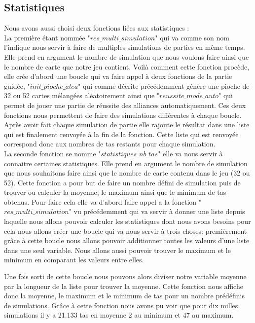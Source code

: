 \documentclass[10pt,a4paper,french,titlepage]{article}
\theoremstyle{definition}
\begin{document}
\subsection{Statistiques}
Nous avons aussi choisi deux fonctions liées aux statistiques : \\
La première étant nommée "$res\_multi\_simulation$" qui va comme son nom l'indique nous servir à faire de multiples simulations de parties en même temps. Elle prend en argument le nombre de simulation que nous voulons faire ainsi que le nombre de carte que notre jeu contient. Voilà comment cette fonction procède, elle crée d'abord une boucle qui va faire appel à deux fonctions de la partie guidée, "$init\_pioche\_alea$" qui comme décrite précédemment génère une pioche de 32 ou 52 cartes mélangées aléatoirement ainsi que "$reussite\_mode\_auto$" qui permet de jouer une partie de réussite des alliances automatiquement. Ces deux fonctions nous permettent de faire des simulations différentes à chaque boucle. Après avoir fait chaque simulation de partie elle rajoute le résultat dans une liste qui est finalement renvoyée à la fin de la fonction. Cette liste qui est renvoyée correspond donc aux nombres de tas restants pour chaque simulation.\\

La seconde fonction se nomme "$statistiques\_nb\_tas$" elle va nous servir à connaitre certaines statistiques. Elle prend en argument le nombre de simulation que nous souhaitons faire ainsi que le nombre de carte contenu dans le jeu (32 ou 52). Cette fonction a pour but de faire un nombre défini de simulation puis de trouver ou calculer la moyenne, le maximum ainsi que le minimum de tas obtenus. Pour faire cela elle va d'abord faire appel a la fonction "$res\_multi\_simulation$" vu précédemment qui va servir à donner une liste depuis laquelle nous allons pouvoir calculer les statistiques dont nous avons besoins pour cela nous allons créer une boucle qui va nous servir à trois choses: premièrement grâce à cette boucle nous allons pouvoir additionner toutes les valeurs d'une liste dans une seul variable. Nous allons aussi pouvoir trouver le maximum et le minimum en comparant les valeurs entre elles.

Une fois sorti de cette boucle nous pouvons alors diviser notre variable moyenne par la longueur de la liste pour trouver la moyenne. Cette fonction nous affiche donc la moyenne, le maximum et le minimum de tas pour un nombre prédéfinis de simulations. Grâce à cette fonction nous avons pu voir que pour dix milles simulations il y a 21.133 tas en moyenne 2 au minimum et 47 au maximum.
\end{document}
